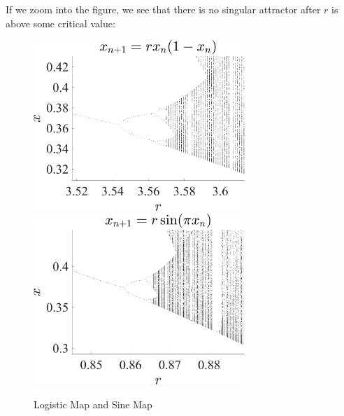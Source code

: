 \documentclass[11pt]{article}
\begin{document}
If we zoom into the figure, we see that there is no singular attractor after $r$ is above some critical value:
\begin{figure}[h]
\centering
\includegraphics[width=8cm]{Logistic_map_zoom_in.png}
\includegraphics[width=8cm]{Sine_map_zoom_in.png}
\caption{Logistic Map and Sine Map }
\end{figure}
\end{document}
